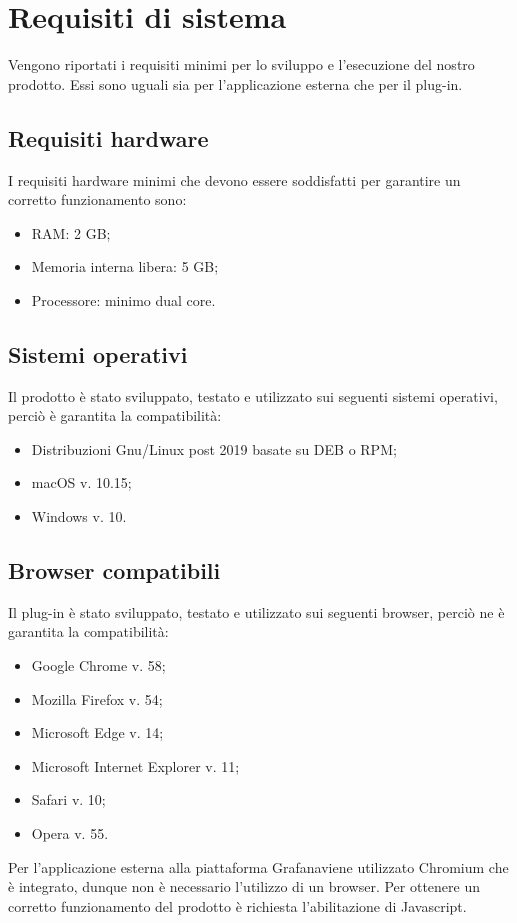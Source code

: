 \section{Requisiti di sistema}
Vengono riportati i requisiti minimi per lo sviluppo e l'esecuzione del nostro prodotto. Essi sono uguali sia per l'applicazione esterna che per il plug-in.

\subsection{Requisiti hardware}
I requisiti hardware minimi che devono essere soddisfatti per garantire un corretto funzionamento sono:
\begin{itemize}
	\item RAM: 2 GB;
	\item Memoria interna libera: 5 GB;
	\item Processore: minimo dual core.
\end{itemize}

\subsection{Sistemi operativi}
Il prodotto è stato sviluppato, testato e utilizzato sui seguenti sistemi operativi, perciò è garantita la compatibilità:
\begin{itemize}
	\item Distribuzioni Gnu/Linux post 2019 basate su DEB o RPM;
	\item macOS v. 10.15;
	\item Windows v. 10.
\end{itemize}

\subsection{Browser compatibili}
Il plug-in è stato sviluppato, testato e utilizzato sui seguenti browser, perciò ne è garantita la compatibilità:
\begin{itemize}
	\item Google Chrome v. 58;
	\item Mozilla Firefox v. 54;
	\item Microsoft Edge v. 14;
	\item Microsoft Internet Explorer v. 11;
	\item Safari v. 10;
	\item Opera v. 55.
\end{itemize}
Per l'applicazione esterna alla piattaforma Grafana\glosp viene utilizzato Chromium che è integrato, dunque non è necessario l'utilizzo di un browser.
Per ottenere un corretto funzionamento del prodotto è richiesta l'abilitazione di Javascript.
